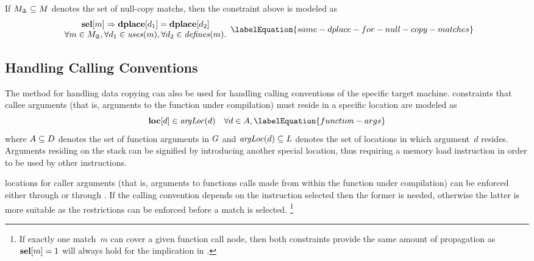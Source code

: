 If \mbox{$\mNullCopyMatchSet \subseteq \mMatchSet$} denotes the set of
\glspl{null-copy match}, then the \gls{constraint} above is modeled as
%
\begin{equation}
  \begin{array}{c}
    \mVar{sel}[m]
    \mImp
    \mVar{dplace}[d_1] = \mVar{dplace}[d_2] \\
    \forall m \in \mNullCopyMatchSet \hspace{-.8pt},
    \forall d_1 \in \mUses(m),
    \forall d_2 \in \mDefines(m).
  \end{array}
  \labelEquation{same-dplace-for-null-copy-matches}
\end{equation}


\subsection{Handling Calling Conventions}

The method for handling \gls{data copying} can also be used for handling calling
conventions of the specific \gls{target machine}.
%
\Glspl{constraint} that callee arguments (that is, arguments to the
\gls{function} under compilation) must reside in a specific \gls{location} are
modeled as
%
\begin{equation}
  \mVar{loc}[d] \in \mArgLoc(d)
  \mQuantSep
  \forall d \in \mArgSet,
  \labelEquation{function-args}
\end{equation}
%
where \mbox{$\mArgSet \subseteq \mDataSet$} denotes the set of \gls{function}
arguments in $G$ and \mbox{$\operatorname{\textrm{\textit{argLoc}}}(d) \subseteq L$}
denotes the set of \glspl{location} in which argument~$d$ resides.
%
Arguments residing on the stack can be signified by introducing another special
\gls{location}, thus requiring a memory load \gls{instruction} in order to be
used by other \glspl{instruction}.

\Glspl{location} for caller arguments (that is, arguments to \glspl{function}
calls made from within the \gls{function} under compilation) can be enforced
either through  or through
.
%
If the calling convention depends on the \gls{instruction} selected then the
former is needed, otherwise the latter is more suitable as the restrictions can
be enforced before a \gls{match} is selected.\!%
%
\footnote{%
  If exactly one \gls{match}~$m$ can cover a given \gls{function} call
  \gls{node}, then both \glspl{constraint} provide the same amount of
  \gls{propagation} as \mbox{$\mVar{sel}[m] = 1$} will always hold for the
  implication in .
}


